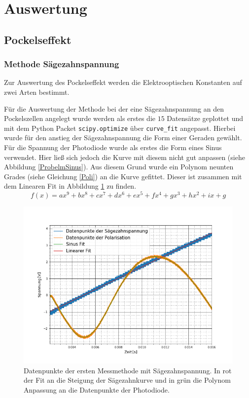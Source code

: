 \section{Auswertung}
\subsection{Pockelseffekt}
\subsubsection{Methode Sägezahnspannung}
Zur Auswertung des Pockelseffekt werden die Elektrooptischen Konstanten auf zwei Arten bestimmt. \par
Für die Auswertung der Methode bei der eine Sägezahnspannung an den Pockelszellen angelegt wurde werden als erstes die $15$ Datensätze geplottet und mit dem Python Packet \verb|scipy.optimize| über \verb|curve_fit| angepasst. Hierbei wurde für den anstieg der Sägezahnspannung die Form einer Geraden gewählt. Für die Spannung der Photodiode wurde als erstes die Form eines Sinus verwendet. Hier ließ sich jedoch die Kurve mit diesem nicht gut anpassen (siehe Abbildung \ref{ProbelmSinus}). Aus diesem Grund wurde ein Polynom neunten Grades (siehe Gleichung \ref{Poli}) an die Kurve gefittet. Dieser ist zusammen mit dem Linearen Fit in Abbildung \ref{PoliBild} zu finden.
\begin{equation}
	f(x)=ax^9+bx^8+c x^7+d x^6+ex^5+f x^4+gx^3+hx^2+ix+g
	\label{Poli}
\end{equation}
\begin{figure}[ht]
	\includegraphics[scale=0.5]{Bild/V1_1}
	\centering
	\caption[Plot zu Versuchsteil 1]{\small Datenpunkte der ersten Messmethode mit Sägezahnspannung. In rot der Fit an die Steigung der Sägezahnkurve und in grün die Polynom Anpassung an die Datenpunkte der Photodiode.}
	\label{PoliBild}
\end{figure}
